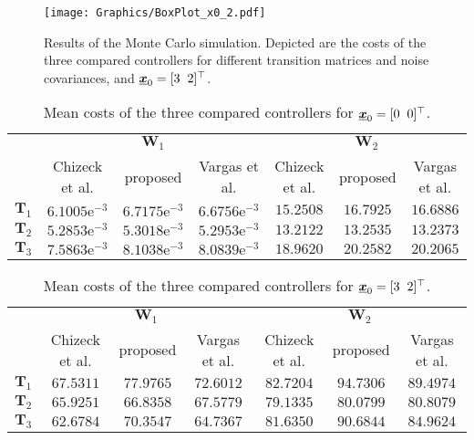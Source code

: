 \documentclass[preprint,1p,11pt]{IR-Template/ISAS_IR}
\newcommand{\rvec}[1]{\ensuremath{{\boldsymbol{\underline{#1}}}}}
\newcommand{\mat}[1]{{\ensuremath{{\mathbf{#1}}}}}
\newcommand{\tr}{^{\top}}
\newcommand{\xsys}[1]{\rvec{x}_{#1}}
\newcommand{\wCov}{\mat{W}}
\newcommand{\TransitionMatrix}[1]{\mat{T}_{#1}}
\begin{document}
\begin{figure}[h]
\centering
\texttt{[image: Graphics/BoxPlot\_x0\_2.pdf]}
\caption{Results of the Monte Carlo simulation. Depicted are the costs of the three compared controllers for different transition matrices and noise covariances, and $\xsys{0} =\lbrack 3\hspace{2mm}  2\rbrack\tr$.}
\label{fig:MC_x0_2}
\end{figure}

\begin{table}[h]
\centering
\begin{tabular}{ccccccc}
\toprule
& \multicolumn{3}{c}{$\wCov_1$} & \multicolumn{3}{c}{$\wCov_2$}\\ \cmidrule{2-7}
& Chizeck et al. & proposed & Vargas et al.& Chizeck et al. & proposed & Vargas et al.\\\cmidrule{1-7}
\multicolumn{1}{c}{$\TransitionMatrix{1}$}& $6.1005\text{e}^{-3}$ & $6.7175\text{e}^{-3}$ & $6.6756\text{e}^{-3}$ & $15.2508$ & $16.7925$ & $16.6886$ \\
\cmidrule{1-7}
\multicolumn{1}{c}{$\TransitionMatrix{2}$}& $5.2853\text{e}^{-3}$ & $5.3018\text{e}^{-3}$ & $5.2953\text{e}^{-3}$ & $13.2122$ & $13.2535$ & $13.2373$ \\
\cmidrule{1-7}
\multicolumn{1}{c}{$\TransitionMatrix{3}$}& $7.5863\text{e}^{-3}$ & $8.1038\text{e}^{-3}$ & $8.0839\text{e}^{-3}$ & $18.9620$ & $20.2582$ & $20.2065$ \\
\bottomrule
\end{tabular}
\caption{Mean costs of the three compared controllers for $\xsys{0} =\lbrack 0\hspace{2mm}  0\rbrack\tr$.}
\label{tab:Costs_1}
\end{table}

\begin{table}[h]
\centering
\begin{tabular}{ccccccc}
\toprule
& \multicolumn{3}{c}{$\wCov_1$} & \multicolumn{3}{c}{$\wCov_2$}\\ \cmidrule{2-7}
& Chizeck et al. & proposed & Vargas et al.& Chizeck et al. & proposed & Vargas et al.\\\cmidrule{1-7}
\multicolumn{1}{c}{$\TransitionMatrix{1}$}& $67.5311$ & $77.9765$ & $72.6012$ & $82.7204$ & $94.7306$ & $89.4974$ \\
\cmidrule{1-7}
\multicolumn{1}{c}{$\TransitionMatrix{2}$}& $65.9251$ & $66.8358$ & $67.5779$ & $79.1335$ & $80.0799$ & $80.8079$ \\
\cmidrule{1-7}
\multicolumn{1}{c}{$\TransitionMatrix{3}$}& $62.6784$ & $70.3547$ & $64.7367$ & $81.6350$ & $90.6844$ & $84.9624$ \\
\bottomrule
\end{tabular}
\caption{Mean costs of the three compared controllers for $\xsys{0} =\lbrack 3\hspace{2mm}  2\rbrack\tr$.}
\label{tab:Costs_2}
\end{table}
\end{document}
